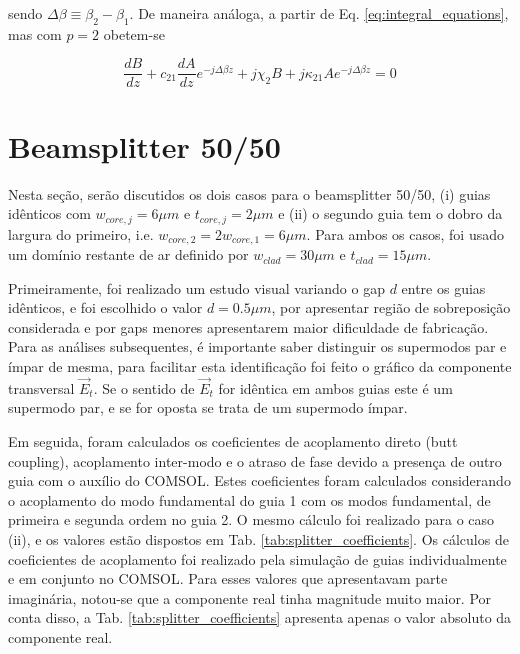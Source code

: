 \documentclass[final,12pt,times,twocolumn]{elsarticle}
\begin{document}
sendo $\Delta\beta\equiv\beta_2-\beta_1$. De maneira análoga, a partir de Eq. \eqref{eq:integral_equations}, mas com $p=2$ obetem-se

\begin{equation}
\frac{dB}{dz} + c_{21}\frac{dA}{dz}e^{-j\Delta\beta z} + j\chi_2B + j\kappa_{21}Ae^{-j\Delta\beta z} = 0
\end{equation} 

\section{Beamsplitter 50/50}
\label{sec:splitter}

Nesta seção, serão discutidos os dois casos para o beamsplitter 50/50, (i) guias idênticos com $w_{core,j} = 6\mu m$ e $t_{core, j} = 2\mu m$ e (ii) o segundo guia tem o dobro da largura do primeiro, i.e. $w_{core,2} = 2w_{core,1} = 6\mu m$. Para ambos os casos, foi usado um domínio restante de ar definido por $w_{clad} = 30\mu m$ e $t_{clad} = 15\mu m$.

Primeiramente, foi realizado um estudo visual variando o gap $d$ entre os guias idênticos, e foi escolhido o valor $d = 0.5\mu m$, por apresentar região de sobreposição considerada e por gaps menores apresentarem maior dificuldade de fabricação. Para as análises subsequentes, é importante saber distinguir os supermodos par e ímpar de mesma, para facilitar esta identificação foi feito o gráfico da componente transversal $\vec{E}_t$. Se o sentido de $\vec{E}_t$ for idêntica em ambos guias este é um supermodo par, e se for oposta se trata de um supermodo ímpar.

Em seguida, foram calculados os coeficientes de acoplamento direto (butt coupling), acoplamento inter-modo e o atraso de fase devido a presença de outro guia com o auxílio do COMSOL. Estes coeficientes foram calculados considerando o acoplamento do modo fundamental do guia 1 com os modos fundamental, de primeira e segunda ordem no guia 2. O mesmo cálculo foi realizado para o caso (ii), e os valores estão dispostos em Tab. \ref{tab:splitter_coefficients}. 
Os cálculos de coeficientes de acoplamento foi realizado pela simulação de guias individualmente e em conjunto no COMSOL. Para esses valores que apresentavam parte imaginária, notou-se que a componente real tinha magnitude muito maior. Por conta disso, a Tab. \ref{tab:splitter_coefficients} apresenta apenas o valor absoluto da componente real.
\end{document}
